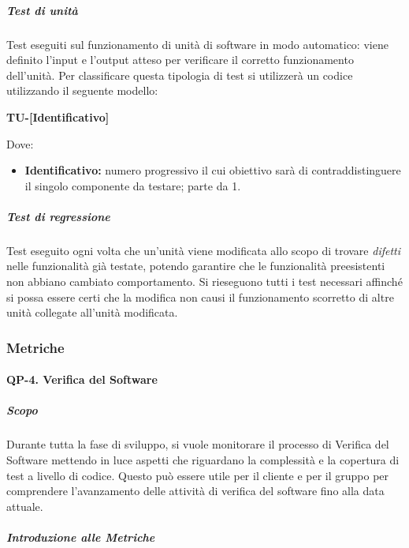                    \subparagraph*{Test di unità}
                            Test eseguiti sul funzionamento di unità di software in modo automatico: viene definito l'input e l'output atteso per verificare il corretto funzionamento dell'unità.
                            Per classificare questa tipologia di test si utilizzerà un codice utilizzando il seguente modello:     

                            \begin{center}
                            	\textbf{TU-[Identificativo]}
                            \end{center}
                            Dove:
                            
							\begin{itemize}
                            	\item \textbf{Identificativo:} numero progressivo il cui obiettivo sarà di contraddistinguere il singolo componente da testare; parte da 1.
							\end{itemize}
						
                    \subparagraph*{Test di regressione}
        				Test eseguito ogni volta che un'unità viene modificata allo scopo di trovare \textit{difetti} nelle funzionalità già testate, potendo garantire che le funzionalità preesistenti non abbiano cambiato comportamento. Si rieseguono tutti i test necessari affinché si possa essere certi che la modifica non causi il funzionamento scorretto di altre unità collegate all'unità modificata.


                \subsubsection{Metriche}
                \paragraph{QP-4. Verifica del Software}

                    \subparagraph{Scopo}

                        Durante tutta la fase di sviluppo, si vuole monitorare il processo di Verifica del Software mettendo in luce aspetti che riguardano la complessità e la copertura di test a livello di codice. Questo può essere utile per il cliente e per il gruppo per comprendere l'avanzamento delle attività di verifica del software fino alla data attuale.

                    \subparagraph{Introduzione alle Metriche}

